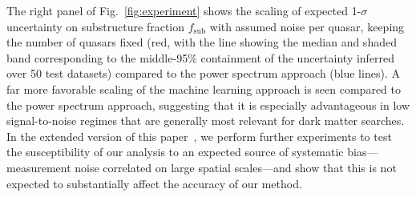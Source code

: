 \documentclass[]{article}
\begin{document}
The right panel of Fig.~\ref{fig:experiment} shows the scaling of expected 1-$\sigma$ uncertainty on substructure fraction $f_\mathrm{sub}$ with assumed noise per quasar, keeping the number of quasars fixed (red, with the line showing the median and shaded band corresponding to the middle-95\% containment of the uncertainty inferred over 50 test datasets) compared to the power spectrum approach (blue lines). A far more favorable scaling of the machine learning approach is seen compared to the power spectrum approach, suggesting that it is especially advantageous in low signal-to-noise regimes that are generally most relevant for dark matter searches. In the extended version of this paper~\cite{Mishra-Sharma:2021nhh}, we perform further experiments to test the susceptibility of our analysis to an expected source of systematic bias---measurement noise correlated on large spatial scales---and show that this is not expected to substantially affect the accuracy of our method.
\vspace{-2.5mm}
\end{document}
